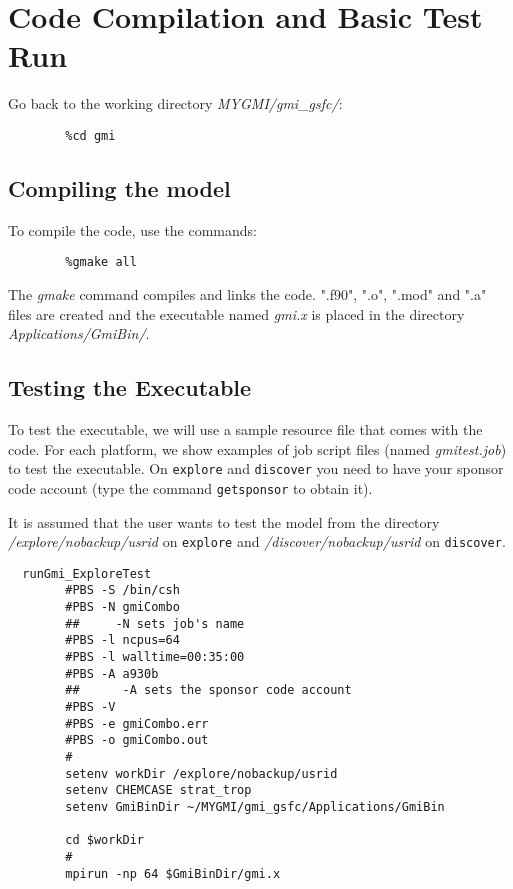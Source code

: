 \section{Code Compilation and Basic Test Run} \label{sec:compilation}
%
Go back to the working directory {\em MYGMI/gmi\_gsfc/}:
%
\begin{verbatim}
        %cd gmi
\end{verbatim}
%
\subsection{Compiling the model}
%

To compile the code, use the commands:
%
\begin{verbatim}
        %gmake all
\end{verbatim}
%
The {\em gmake} command compiles and links the code.
".f90", ".o", ".mod" and ".a" files are created and the executable named 
{\em gmi.x} is placed in the directory {\em Applications/GmiBin/}.

\subsection{Testing the Executable}

\noindent
To test the executable, we will use a sample resource file that comes with
the code.
For each platform, we show examples of job script files 
(named {\em gmitest.job}) to test the executable.
On {\tt explore} and {\tt discover} you need to have your
sponsor code account (type the command {\tt getsponsor} to obtain it).

It is assumed that the user wants to test the model from the directory
{\em /explore/nobackup/usrid} on {\tt explore} and
{\em /discover/nobackup/usrid} on {\tt discover}.

\begin{verbatim}
  runGmi_ExploreTest
        #PBS -S /bin/csh
        #PBS -N gmiCombo
        ##     -N sets job's name
        #PBS -l ncpus=64
        #PBS -l walltime=00:35:00
        #PBS -A a930b
        ##      -A sets the sponsor code account
        #PBS -V
        #PBS -e gmiCombo.err
        #PBS -o gmiCombo.out
        #
        setenv workDir /explore/nobackup/usrid
        setenv CHEMCASE strat_trop
        setenv GmiBinDir ~/MYGMI/gmi_gsfc/Applications/GmiBin

        cd $workDir
        #
        mpirun -np 64 $GmiBinDir/gmi.x
\end{verbatim}

